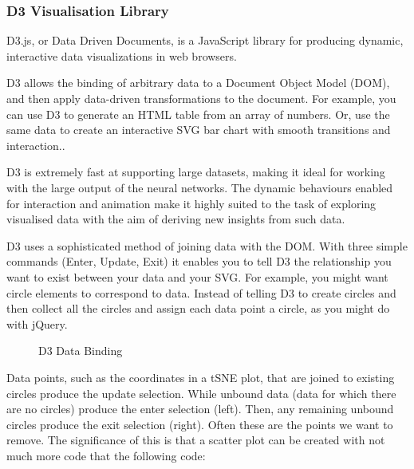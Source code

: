 \documentclass[a4paper,11pt,titlepage]{article}
\begin{document}
		\subsubsection{D3 Visualisation Library}
		D3.js, or Data Driven Documents, is a JavaScript library for producing dynamic, interactive data visualizations in web browsers.
		\par 
		D3 allows the binding of arbitrary data to a Document Object Model (DOM), and then apply data-driven transformations to the document. For example, you can use D3 to generate an HTML table from an array of numbers. Or, use the same data to create an interactive SVG bar chart with smooth transitions and interaction.\cite{Bostock2011a}.
		\par
		D3 is extremely fast at supporting large datasets, making it ideal for working with the large output of the neural networks. The dynamic behaviours enabled for interaction and animation make it highly suited to the task of exploring visualised data with the aim of deriving new insights from such data.

	D3 uses a sophisticated method of joining data with the DOM. With three simple commands (Enter, Update, Exit) it enables you to tell D3 the relationship you want to exist between your data and your SVG. For example, you might want circle elements to correspond to data. Instead of telling D3 to create circles and then collect all the circles and assign each data point a circle, as you might do with jQuery.
	
	\begin{figure}[H]
    			\caption{D3 Data Binding}%
	\end{figure}	
	
	Data points, such as the coordinates in a tSNE plot, that are joined to existing circles produce the update selection. While unbound data (data for which there are no circles) produce the enter selection (left). Then, any remaining unbound circles produce the exit selection (right). Often these are the points we want to remove. The significance of this is that a scatter plot can be created with not much more code that the following code:
	
\end{document}
